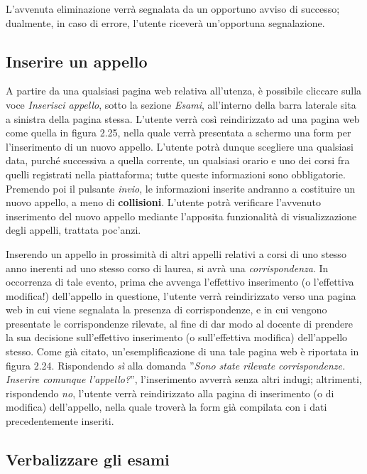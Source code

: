 \documentclass [a4paper,11pt]{book}
\begin{document}
L'avvenuta eliminazione verrà segnalata da un opportuno avviso di successo; dualmente, in caso di errore, l'utente riceverà un'opportuna segnalazione.

\medskip

\subsection{Inserire un appello}

A partire da una qualsiasi pagina web relativa all'utenza, è possibile cliccare sulla voce \emph{Inserisci appello}, sotto la sezione \emph{Esami}, all'interno della barra laterale sita a sinistra della pagina stessa. L'utente verrà così reindirizzato ad una pagina web come quella in figura 2.25, nella quale verrà presentata a schermo una form per l'inserimento di un nuovo appello. L'utente potrà dunque scegliere una qualsiasi data, purché successiva a quella corrente, un qualsiasi orario e uno dei corsi fra quelli registrati nella piattaforma; tutte queste informazioni sono obbligatorie. Premendo poi il pulsante \emph{invio}, le informazioni inserite andranno a costituire un nuovo appello, a meno di \textbf{collisioni}. L'utente potrà verificare l'avvenuto inserimento del nuovo appello mediante l'apposita funzionalità di visualizzazione degli appelli, trattata poc'anzi.

Inserendo un appello in prossimità di altri appelli relativi a corsi di uno stesso anno inerenti ad uno stesso corso di laurea, si avrà una \emph{corrispondenza}. In occorrenza di tale evento, prima che avvenga l'effettivo inserimento (o l'effettiva modifica!) dell'appello in questione, l'utente verrà reindirizzato verso una pagina web in cui viene segnalata la presenza di corrispondenze, e in cui vengono presentate le corrispondenze rilevate, al fine di dar modo al docente di prendere la sua decisione sull'effettivo inserimento (o sull'effettiva modifica) dell'appello stesso. Come già citato, un'esemplificazione di una tale pagina web è riportata in figura 2.24. Rispondendo \emph{sì} alla domanda ''\emph{Sono state rilevate corrispondenze. Inserire comunque l'appello?}'', l'inserimento avverrà senza altri indugi; altrimenti, rispondendo \emph{no}, l'utente verrà reindirizzato alla pagina di inserimento (o di modifica) dell'appello, nella quale troverà la form già compilata con i dati precedentemente inseriti.

\medskip

\subsection{Verbalizzare gli esami}
\end{document}
